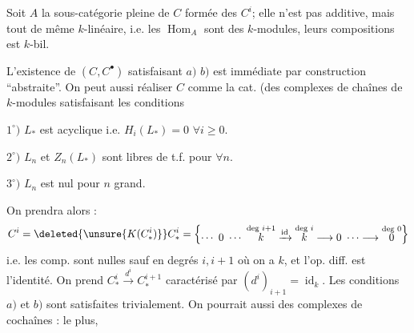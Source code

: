Soit $A$ la sous-catégorie pleine de $C$
formée des \deleted{\unsure{\Phi}} $C^i$; elle n'est pas additive,
mais tout de même  $k$-linéaire,
i.e. les $\operatorname{Hom}_A$ sont des $k$-modules, leurs
compositions est $k$-bil.

L'existence de $(C,C^\bullet)$ satisfaisant $a)$
$b)$ est immédiate par construction ``abstraite''.
On peut aussi réaliser $C$ comme la cat. (des
complexes de chaînes  de $k$-modules
satisfaisant les conditions

$1^\circ)$  $L_*$ est acyclique i.e. $H_i(L_*)=0$ $\forall i\geqslant0$.

$2^\circ)$ $L_n$ et $Z_n(L_*)$ sont libres de t.f. pour $\forall n$.

$3^\circ)$ $L_n$ est nul pour $n$ grand.

On prendra alors :
\[
C^i=\deleted{\unsure{K(C^i_*)}}C^i_*=\left\{
\begin{gathered}
\cdots\ 0\ \cdots\
\overset{\text{deg }i+1}{k}\xrightarrow{\mathrm{id}}
\overset{\text{deg }i}{k}\longrightarrow0\ \cdots\longrightarrow
\overset{\text{deg }0}{0}
\end{gathered}\right\}
\]
i.e. les comp. sont nulles sauf en degrés $i,i+1$ où
on a $k$, et l'op. diff.  est l'identité.
On prend $C^i_*\xrightarrow{d^i}C^{i+1}_*$ caractérisé
par $(d^i)_{i+1}=\operatorname{id}_k$. Les conditions $a)$ et $b)$ sont
satisfaites trivialement. On pourrait aussi
 des complexes de cochaînes : le plus,

